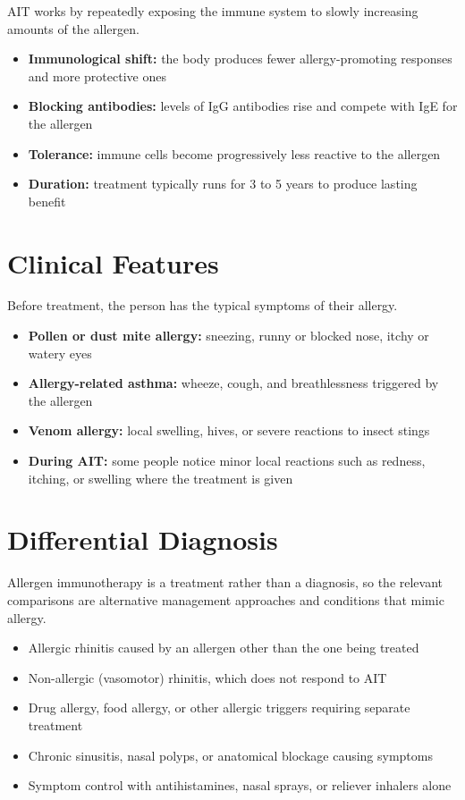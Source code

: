 AIT works by repeatedly exposing the immune system to slowly increasing amounts of the allergen.

\begin{itemize}
    \item \textbf{Immunological shift:} the body produces fewer allergy-promoting responses and more protective ones
    \item \textbf{Blocking antibodies:} levels of IgG antibodies rise and compete with IgE for the allergen
    \item \textbf{Tolerance:} immune cells become progressively less reactive to the allergen
    \item \textbf{Duration:} treatment typically runs for 3 to 5 years to produce lasting benefit
\end{itemize}

\section*{Clinical Features}
Before treatment, the person has the typical symptoms of their allergy.

\begin{itemize}
    \item \textbf{Pollen or dust mite allergy:} sneezing, runny or blocked nose, itchy or watery eyes
    \item \textbf{Allergy-related asthma:} wheeze, cough, and breathlessness triggered by the allergen
    \item \textbf{Venom allergy:} local swelling, hives, or severe reactions to insect stings
    \item \textbf{During AIT:} some people notice minor local reactions such as redness, itching, or swelling where the treatment is given
\end{itemize}

\section*{Differential Diagnosis}
Allergen immunotherapy is a treatment rather than a diagnosis, so the relevant comparisons are alternative management approaches and conditions that mimic allergy.

\begin{itemize}
    \item Allergic rhinitis caused by an allergen other than the one being treated
    \item Non-allergic (vasomotor) rhinitis, which does not respond to AIT
    \item Drug allergy, food allergy, or other allergic triggers requiring separate treatment
    \item Chronic sinusitis, nasal polyps, or anatomical blockage causing symptoms
    \item Symptom control with antihistamines, nasal sprays, or reliever inhalers alone
\end{itemize}

